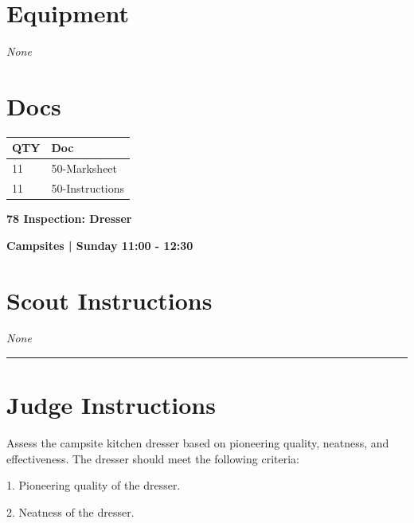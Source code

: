 \documentclass[10pt]{article}
\newcommand{\newtitle}[1]{\begin{center}{\Huge\bfseries #1 }\\ \vspace{5mm}\end{center}}
\newcommand{\newsubtitle}[1]{\begin{center}{\color{grey}\Large\bfseries #1 }\\ \vspace{5mm}\end{center}}
\begin{document}
	\begin{multicols}{2}

		\section*{\faWrench \: Equipment}

				\textit{None}
		
		\vfill\null
		\columnbreak

			\section*{\faFile \: Docs}
		 	\begin{center}
			\begin{tabular}{p{2cm}p{4cm}}

			\textbf{QTY} & \textbf{Doc} \\\toprule
										11&50-Marksheet\\\midrule
										11&50-Instructions\\\midrule
							\end{tabular}
			\end{center}
	

		\vfill\null

		\end{multicols}



	\vspace{1cm}


	\clearpage
		\newtitle{78 Inspection: Dresser }
	\newsubtitle{Campsites | Sunday 11:00 - 12:30}
		\setcounter{section}{77}
	\section*{Scout Instructions}
		\textit{None}
	
	\vspace{0.5cm}
	\hrule
	\vspace{0.5cm}

		\section*{Judge Instructions}
		Assess the campsite kitchen dresser based on pioneering quality, neatness, and effectiveness. The dresser should meet the following criteria:



1. Pioneering quality of the dresser.

2. Neatness of the dresser.
\end{document}

